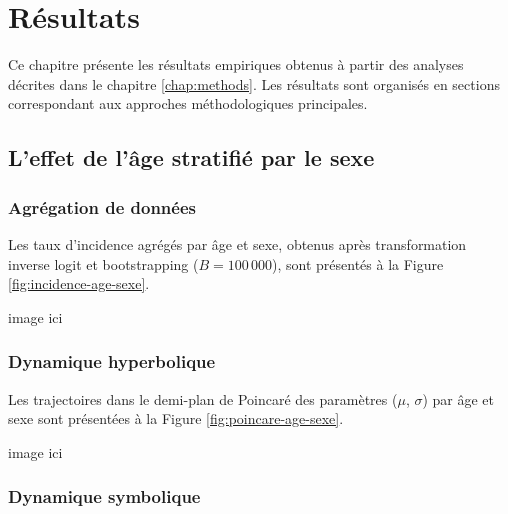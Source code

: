 \chapter{Résultats}
\label{chap:results}

Ce chapitre présente les résultats empiriques obtenus à partir des analyses décrites dans le chapitre \ref{chap:methods}. Les résultats sont organisés en sections correspondant aux approches méthodologiques principales.

\section{L'effet de l'âge stratifié par le sexe}

\subsection{Agrégation de données}

Les taux d'incidence agrégés par âge et sexe, obtenus après transformation inverse logit et bootstrapping ($B = 100\,000$), sont présentés à la Figure \ref{fig:incidence-age-sexe}.

image ici

\subsection{Dynamique hyperbolique}

Les trajectoires dans le demi-plan de Poincaré des paramètres ($\mu$, $\sigma$) par âge et sexe sont présentées à la Figure \ref{fig:poincare-age-sexe}.

image ici

\subsection{Dynamique symbolique}

